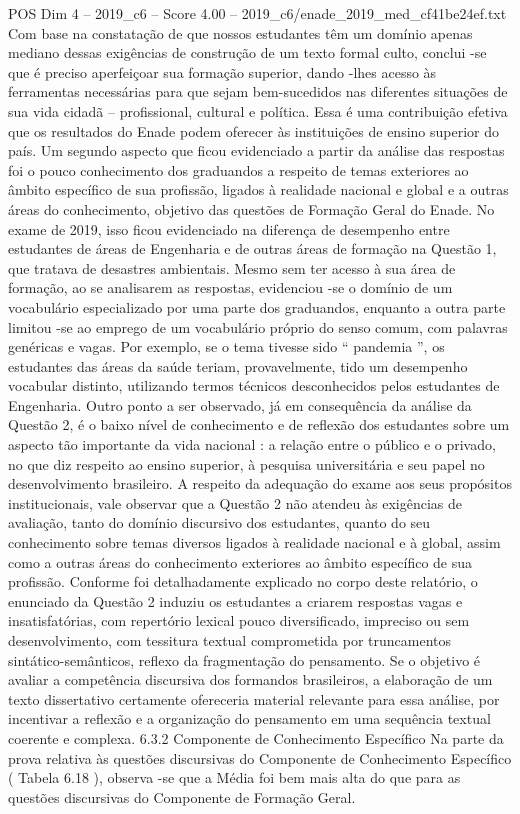 \begin{textsample}{POS Dim 4 – 2019\_c6 – Score 4.00 – 2019\_c6/enade\_2019\_med\_cf41be24ef.txt}
Com base na constatação de que nossos estudantes têm um domínio apenas mediano dessas exigências de construção de um texto formal culto, conclui -se que é preciso aperfeiçoar sua formação superior, dando -lhes acesso às ferramentas necessárias para que sejam bem-sucedidos nas diferentes situações de sua vida cidadã – profissional, cultural e política.
Essa é uma contribuição efetiva que os resultados do Enade podem oferecer às instituições de ensino superior do país.
Um segundo aspecto que ficou evidenciado a partir da análise das respostas foi o pouco conhecimento dos graduandos a respeito de temas exteriores ao âmbito específico de sua profissão, ligados à realidade nacional e global e a outras áreas do conhecimento, objetivo das questões de Formação Geral do Enade.
No exame de 2019, isso ficou evidenciado na diferença de desempenho entre estudantes de áreas de Engenharia e de outras áreas de formação na Questão 1, que tratava de desastres ambientais.
Mesmo sem ter acesso à sua área de formação, ao se analisarem as respostas, evidenciou -se o domínio de um vocabulário especializado por uma parte dos graduandos, enquanto a outra parte limitou -se ao emprego de um vocabulário próprio do senso comum, com palavras genéricas e vagas.
Por exemplo, se o tema tivesse sido “ pandemia ”, os estudantes das áreas da saúde teriam, provavelmente, tido um desempenho vocabular distinto, utilizando termos técnicos desconhecidos pelos estudantes de Engenharia.
Outro ponto a ser observado, já em consequência da análise da Questão 2, é o baixo nível de conhecimento e de reflexão dos estudantes sobre um aspecto tão importante da vida nacional : a relação entre o público e o privado, no que diz respeito ao ensino superior, à pesquisa universitária e seu papel no desenvolvimento brasileiro.
A respeito da adequação do exame aos seus propósitos institucionais, vale observar que a Questão 2 não atendeu às exigências de avaliação, tanto do domínio discursivo dos estudantes, quanto do seu conhecimento sobre temas diversos ligados à realidade nacional e à global, assim como a outras áreas do conhecimento exteriores ao âmbito específico de sua profissão.
Conforme foi detalhadamente explicado no corpo deste relatório, o enunciado da Questão 2 induziu os estudantes a criarem respostas vagas e insatisfatórias, com repertório lexical pouco diversificado, impreciso ou sem desenvolvimento, com tessitura textual comprometida por truncamentos sintático-semânticos, reflexo da fragmentação do pensamento.
Se o objetivo é avaliar a competência discursiva dos formandos brasileiros, a elaboração de um texto dissertativo certamente ofereceria material relevante para essa análise, por incentivar a reflexão e a organização do pensamento em uma sequência textual coerente e complexa. 6.3.2 Componente de Conhecimento Específico Na parte da prova relativa às questões discursivas do Componente de Conhecimento Específico ( Tabela 6.18 ), observa -se que a Média foi bem mais alta do que para as questões discursivas do Componente de Formação Geral.

\end{textsample}
